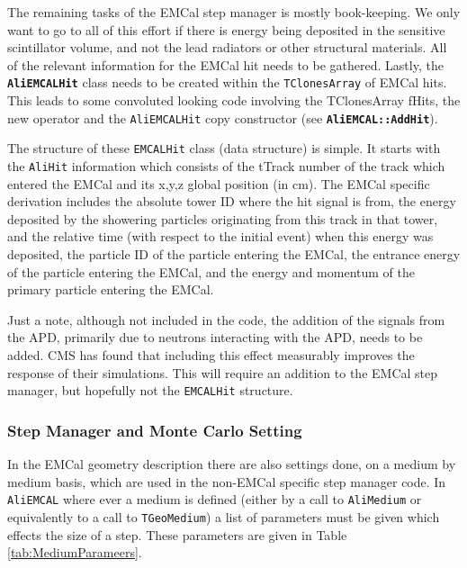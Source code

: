 The remaining tasks of the EMCal step manager is mostly book-keeping.
We only want to go to all of this effort if there is energy
being deposited in the sensitive scintillator volume, and not the
lead radiators or other structural materials. All of the relevant
information for the EMCal hit needs to be gathered. Lastly,
the \texttt{\bf AliEMCALHit} class needs to be created within the
\texttt{TClonesArray} of EMCal hits. This leads to some convoluted
looking code involving the TClonesArray fHits, the new
operator and the \texttt{AliEMCALHit} copy constructor (see
\texttt{\bf AliEMCAL::AddHit}).

The structure of these \texttt{EMCALHit} class (data structure) is
simple. It starts with the \texttt{AliHit} information which 
consists of the tTrack number of the track which entered 
the EMCal and its x,y,z global position (in cm). The EMCal specific
derivation includes the absolute tower ID where the hit signal is
from, the energy deposited by the showering particles
originating from this track in that tower, and the relative time
(with respect to the initial event) when this energy was deposited, 
the particle ID of the particle entering the EMCal, the entrance 
energy of the particle entering the EMCal, and the energy and 
momentum of the primary particle entering the EMCal.

Just a note, although not included in the code, the addition of
the signals from the APD, primarily due to neutrons interacting
with the APD, needs to be added. CMS has found that including
this effect measurably improves the response of their simulations.
This will require an addition to the EMCal step manager, but hopefully
not the \texttt{EMCALHit} structure.

\subsubsection{Step Manager and Monte Carlo Setting}
In the EMCal geometry description there are also settings done,
on a medium by medium basis, which are used in the non-EMCal
specific step manager code. In \texttt{AliEMCAL} where ever
a medium is defined (either by a call to \texttt{AliMedium}
or equivalently to a call to \texttt{TGeoMedium}) a list of
parameters must be given which effects the size of a step.
These parameters are given in Table \ref{tab:MediumParameers}.



